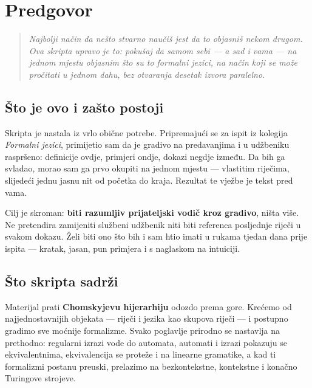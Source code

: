 \documentclass[12pt,a4paper]{report}
\begin{document}
\chapter*{Predgovor}

\begin{quote}
\itshape
Najbolji način da nešto stvarno naučiš jest da to objasniš nekom drugom.
Ova skripta upravo je to: pokušaj da samom sebi --- a sad i vama --- na
jednom mjestu objasnim što su to formalni jezici, na način koji se može
pročitati u jednom dahu, bez otvaranja desetak izvora paralelno.
\end{quote}


\section*{Što je ovo i zašto postoji}

Skripta je nastala iz vrlo obične potrebe. Pripremajući se za ispit iz
kolegija \emph{Formalni jezici}, primijetio sam da je gradivo na
predavanjima i u udžbeniku raspršeno: definicije ovdje, primjeri ondje,
dokazi negdje između. Da bih ga svladao, morao sam ga prvo okupiti na
jednom mjestu --- vlastitim riječima, slijedeći jednu jasnu nit od
početka do kraja. Rezultat te vježbe je tekst pred vama.

Cilj je skroman: \textbf{biti razumljiv prijateljski vodič kroz gradivo},
ništa više. Ne pretendira zamijeniti službeni udžbenik niti biti
referenca posljednje riječi u svakom dokazu. Želi biti ono što bih i sam
htio imati u rukama tjedan dana prije ispita --- kratak, jasan,
pun primjera i s naglaskom na intuiciji.

\section*{Što skripta sadrži}

Materijal prati \textbf{Chomskyjevu hijerarhiju} odozdo prema gore.
Krećemo od najjednostavnijih objekata --- riječi i jezika kao skupova
riječi --- i postupno gradimo sve moćnije formalizme. Svako poglavlje
prirodno se nastavlja na prethodno: regularni izrazi vode do automata,
automati i izrazi pokazuju se ekvivalentnima, ekvivalencija se proteže
i na linearne gramatike, a kad ti formalizmi postanu preuski, prelazimo
na bezkontekstne, kontekstne i konačno Turingove strojeve.
\end{document}
